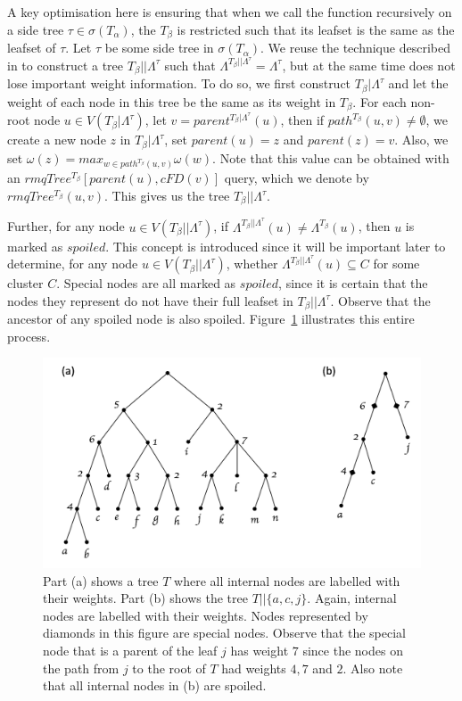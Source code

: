 \documentclass{article}
\newcommand{\leafset}{\Lambda}
\newcommand{\weight}{\omega}
\newcommand{\TA}{T_\alpha}
\newcommand{\TB}{T_\beta}
\begin{document}
    A key optimisation here is ensuring that when we call the function recursively on a side tree $\tau \in \sigma(\TA)$, the $\TB$ is restricted such that its leafset is the same as the leafset of $\tau$. Let $\tau$ be some side tree in $\sigma(\TA)$. We reuse the technique described in \cite{jansson2018algorithms} to construct a tree $\TB||\leafset^{\tau}$ such that $\leafset^{\TB||\leafset^{\tau}} = \leafset^{\tau}$, but at the same time does not lose important weight information. To do so, we first construct $\TB|\leafset^{\tau}$ and let the weight of each node in this tree be the same as its weight in $\TB$. For each non-root node $u \in V(\TB|\leafset^{\tau})$, let $v = parent^{\TB|\leafset^{\tau}}(u)$, then if $path^{\TB}(u, v) \neq \emptyset$, we create a new node $z$ in $\TB|\leafset^{\tau}$, set $parent(u) = z$ and $parent(z) = v$. Also, we set $\weight(z) = max_{w \in path^{\TB}(u, v)} \weight(w)$. Note that this value can be obtained with an $rmqTree^{\TB}[parent(u), cFD(v)]$ query, which we denote by $rmqTree^{\TB}(u, v)$. This gives us the tree $\TB||\leafset^{\tau}$.

    Further, for any node $u \in V(\TB||\leafset^{\tau})$, if $\leafset^{\TB||\leafset^{\tau}}(u) \neq \leafset^{\TB}(u)$, then $u$ is marked as $spoiled$. This concept is introduced since it will be important later to determine, for any node $u \in V(\TB||\leafset^{\tau})$, whether $\leafset^{\TB||\leafset^{\tau}}(u) \subseteq C$ for some cluster $C$. Special nodes are all marked as $spoiled$, since it is certain that the nodes they represent do not have their full leafset in $\TB||\leafset^{\tau}$. Observe that the ancestor of any spoiled node is also spoiled. Figure~\ref{fig:specialnodes} illustrates this entire process.

    \begin{figure}[h]
        \includegraphics[scale=0.5]{specialnodes}
        \centering
        \caption{Part (a) shows a tree $T$ where all internal nodes are labelled with their weights. Part (b) shows the tree $T||\{a, c, j\}$. Again, internal nodes are labelled with their weights. Nodes represented by diamonds in this figure are special nodes. Observe that the special node that is a parent of the leaf $j$ has weight $7$ since the nodes on the path from $j$ to the root of $T$ had weights $4, 7$ and $2$. Also note that all internal nodes in (b) are spoiled.}
        \label{fig:specialnodes}
    \end{figure}
\end{document}
